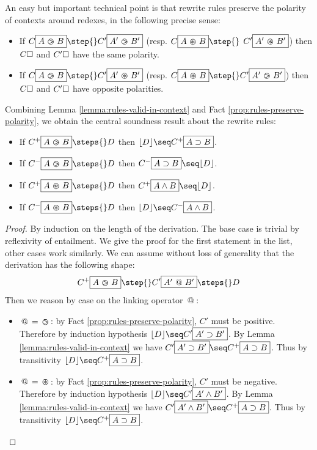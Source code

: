 An easy but important technical point is that rewrite rules preserve the
polarity of contexts around redexes, in the following precise sense:
\begin{fact}\label{prop:rules-preserve-polarity}
  \phantom{a}
  \begin{itemize}
    \item
      If $C\select{A\back B} \step{} C'\select{A'\back B'}$
      (resp. $C\select{A \forw B} \step{} $ $ C' \allowbreak\fbox{$A' \operatorname{\,\varoast\,} B'$}$) then
      $C\square$ and $C'\square$ have the same polarity.
    \item
      If $C\select{A\back B} \step{} C'\select{A'\forw B'}$ (resp.
      $C\select{A\forw B} \step{} C'\select{A'\back B'}$) then $C\square$ and
      $C'\square$ have opposite polarities.
  \end{itemize}
\end{fact}

Combining Lemma \ref{lemma:rules-valid-in-context} and Fact
\ref{prop:rules-preserve-polarity}, we obtain the central soundness result
about the rewrite rules:
\begin{lemma}\label{lemma:rewriting-valid-in-context}
  \phantom{a}
  \begin{itemize}
    \item If $C^+\select{A\back B}\steps{} D$ then $\lint{D} \seq C^+\select{A\limp B}$.
    \item If $C^-\select{A\back B} \steps{} D$ then $C^-\select{A\limp B}\seq \lint{D}$.
    \item If $C^+\select{A \forw B} \steps{} D$ then $ C^+\select{A \land B}\seq \lint{D}$.
    \item If $C^-\select{A \forw B} \steps{} D$ then $\lint{D} \seq C^-\select{A \land B}$.
  \end{itemize}
\end{lemma}
\begin{proof}
  By induction on the length of the derivation. The base case is trivial by
  reflexivity of entailment. We give the proof for the first statement in the
  list, other cases work similarly. We can assume without loss of generality
  that the derivation has the following shape:
  $$C^+\select{A \back B} \step{} C'\select{A' \link B'} \steps{} D$$
  Then we reason by case on the linking operator $\operatorname{\,@\,}$:
  \begin{itemize}
    \item $\operatorname{\,@\,} = \operatorname{\,\varogreaterthan\,}$: by Fact \ref{prop:rules-preserve-polarity}, $C'$ must
    be positive. Therefore by induction hypothesis $\lint{D} \seq C'\select{A'
    \limp B'}$. By Lemma \ref{lemma:rules-valid-in-context} we have
    $C'\select{A' \limp B'} \seq C^+\select{A \limp B}$. Thus by transitivity
    $\lint{D} \seq C^+\select{A \limp B}$.
    \item $\operatorname{\,@\,} = \operatorname{\,\varoast\,}$: by Fact \ref{prop:rules-preserve-polarity}, $C'$ must
    be negative. Therefore by induction hypothesis $\lint{D} \seq C'\select{A'
    \land B'}$. By Lemma \ref{lemma:rules-valid-in-context} we have
    $C'\select{A' \land B'} \seq C^+\select{A \limp B}$. Thus by transitivity
    $\lint{D} \seq C^+\select{A \limp B}$.
  \end{itemize}
\end{proof}

